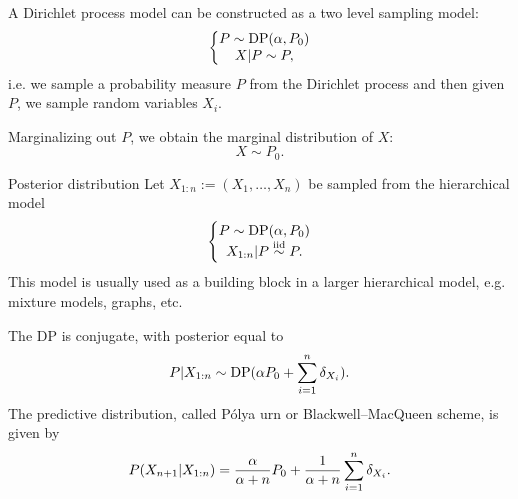 A Dirichlet process model can be constructed as a two level sampling model:
\begin{equation*}
    \left \{ \begin{matrix}
P \sim \text{DP}(\alpha, P_0)\\ 
X|P \sim P,
\end{matrix}\right.
\end{equation*}
i.e. we  sample a probability measure $P$ from the Dirichlet process and then given  $P$, we sample random variables $X_i$.\bigskip

\textcolor{red2}{Marginalizing out $P$}, we obtain the marginal distribution of $X$:
$$X\sim P_0.$$




{Posterior distribution}
	Let $X_{1:n} := (X_1,\ldots, X_n)$ be sampled from the hierarchical model 
\begin{equation*}
    \left \{ \begin{matrix}
P \sim \text{DP}(\alpha, P_0)\\ 
X_{1:n}|P \stackrel{\mbox{\scriptsize{iid}}}{\sim} P.
\end{matrix}\right.
\end{equation*}
This model is usually used as a building block in a larger hierarchical model, e.g. mixture models, graphs, etc. 
\begin{theorem} 
The DP is \alert{conjugate}, with posterior equal to
\begin{equation*}
    P|X_{1:n}\sim \text{DP}(\alpha P_0 + \sum_{i=1}^n\delta_{X_i}).
\end{equation*}
The \alert{predictive distribution}, called \alert{P\'olya urn} or \alert{Blackwell--MacQueen scheme}, is given by
\begin{equation*}
    P(X_{n+1} | X_{1:n}) = \frac{\alpha}{\alpha +n} P_0 + \frac{1}{\alpha + n}\sum_{i=1}^n\delta_{X_i}.
\end{equation*}
\end{theorem}



